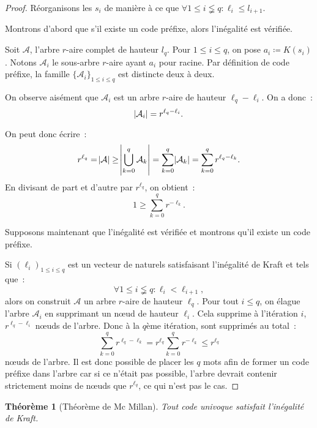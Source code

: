 \documentclass{article}
\newtheorem{thm}{Théorème}[section]
\theoremstyle{definition}
\theoremstyle{remark}
\begin{document}
		\begin{proof} Réorganisons les $s_i$ de manière à ce que $\forall 1 \leq i \lneqq q : \ell_i \leq l_{i+1}$.

		Montrons d'abord que s'il existe un code préfixe, alors l'inégalité est vérifiée.

		Soit $\mathcal A$, l'arbre $r$-aire complet de hauteur $l_q$. Pour $1 \leq i \leq q$, on pose $a_i \coloneqq K(s_i)$. Notons $\mathcal A_i$ le
		sous-arbre $r$-aire ayant $a_i$ pour racine. Par définition de code préfixe, la famille $\{\mathcal A_i\}_{1 \leq i \leq q}$ est distincte deux à deux.

		On observe aisément que $\mathcal A_i$ est un arbre $r$-aire de hauteur $\ell_q - \ell_i$. On a donc~:
		\[\abs {\mathcal A_i} = r^{\ell_q-\ell_i}.\]

		On peut donc écrire~:
		\[r^{\ell_q} = \abs {\mathcal A} \geq \abs {\bigcup_{k=0}^q\mathcal A_k} = \sum_{k=0}^q \abs {\mathcal A_k} = \sum_{k=0}^qr^{\ell_q-\ell_k}.\]
		En divisant de part et d'autre par $r^{\ell_q}$, on obtient~:
		\[1 \geq \sum_{k=0}^qr^{-\ell_k}.\]

		Supposons maintenant que l'inégalité est vérifiée et montrons qu'il existe un code préfixe.

		Si $(\ell_i)_{1 \leq i \leq q}$ est un vecteur de naturels satisfaisant l'inégalité de Kraft et tels que~:
		\[\forall 1 \leq i \lneqq q : \ell_i < \ell_{i+1},\]
		alors on construit $\mathcal A$ un arbre $r$-aire de hauteur $\ell_q$. Pour tout $i \leq q$, on élague l'arbre $\mathcal A_i$ en supprimant un nœud
		de hauteur $\ell_i$. Cela supprime à l'itération $i$, $r^{\ell_q-\ell_i}$ nœuds de l'arbre. Donc à la $q$ème itération, sont supprimés au total~:
		\[\sum_{k=0}^qr^{\ell_q-\ell_k} = r^{\ell_q}\sum_{k=0}^qr^{-\ell_k} \leq r^{\ell_q}\]
		nœuds de l'arbre. Il est donc possible de placer les $q$ mots afin de former un code préfixe dans l'arbre car si ce n'était pas possible, l'arbre
		devrait contenir strictement moins de nœuds que $r^{\ell_q}$, ce qui n'est pas le cas.
		\end{proof}

		\begin{thm}[Théorème de Mc Millan] Tout code univoque satisfait l'inégalité de Kraft. \end{thm}
\end{document}
